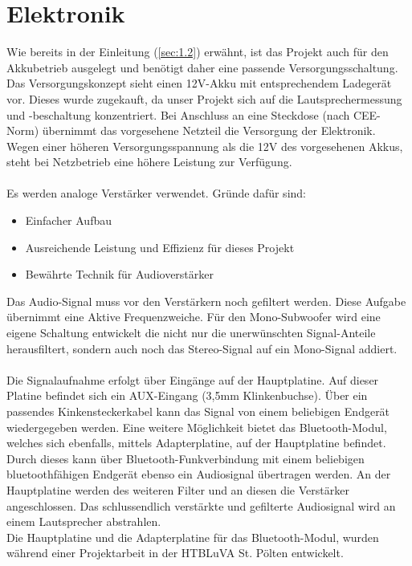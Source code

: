 \section{Elektronik}\label{subsec:2.1.1}
Wie bereits in der Einleitung (\ref{sec:1.2}) erwähnt, ist das Projekt auch für den Akkubetrieb ausgelegt und benötigt daher eine passende Versorgungsschaltung.
Das Versorgungskonzept sieht einen 12V-Akku mit entsprechendem Ladegerät vor.
Dieses wurde zugekauft, da unser Projekt sich auf die Lautsprechermessung und -beschaltung konzentriert.
Bei Anschluss an eine Steckdose (nach CEE-Norm) übernimmt das vorgesehene Netzteil die Versorgung der Elektronik.
Wegen einer höheren Versorgungsspannung als die 12V des vorgesehenen Akkus, steht bei Netzbetrieb eine höhere Leistung zur Verfügung. \\ \\
Es werden analoge Verstärker verwendet.
Gründe dafür sind:
\begin{itemize}
	\item Einfacher Aufbau
	\item Ausreichende Leistung und Effizienz für dieses Projekt
	\item Bewährte Technik für Audioverstärker
\end{itemize} 
Das Audio-Signal muss vor den Verstärkern noch gefiltert werden.
Diese Aufgabe übernimmt eine Aktive Frequenzweiche.
Für den Mono-Subwoofer wird eine eigene Schaltung entwickelt die nicht nur die unerwünschten Signal-Anteile herausfiltert, sondern auch noch das Stereo-Signal auf ein Mono-Signal addiert.\\ \\
Die Signalaufnahme erfolgt über Eingänge auf der Hauptplatine.
Auf dieser Platine befindet sich ein AUX-Eingang (3,5mm Klinkenbuchse).
Über ein passendes Kinkensteckerkabel kann das Signal von einem beliebigen Endgerät wiedergegeben werden.
Eine weitere Möglichkeit bietet das Bluetooth-Modul, welches sich ebenfalls, mittels Adapterplatine, auf der Hauptplatine befindet.
Durch dieses kann über Bluetooth-Funkverbindung mit einem beliebigen bluetoothfähigen Endgerät ebenso ein Audiosignal übertragen werden.
An der Hauptplatine werden des weiteren Filter und an diesen die Verstärker angeschlossen. 
Das schlussendlich verstärkte und gefilterte Audiosignal wird an einem Lautsprecher abstrahlen.\\
Die Hauptplatine und die Adapterplatine für das Bluetooth-Modul, wurden während einer Projektarbeit in der HTBLuVA St. Pölten entwickelt.


